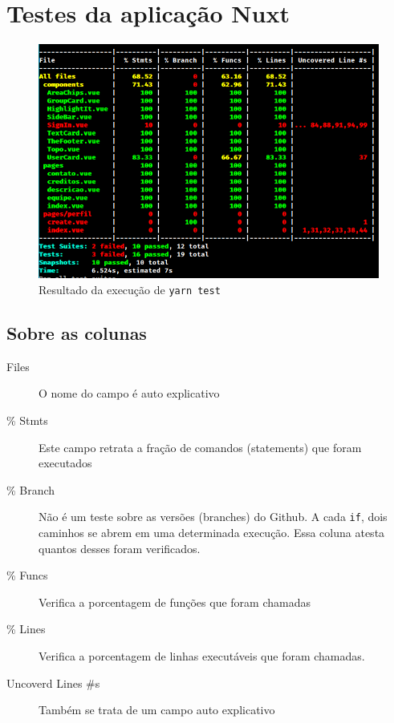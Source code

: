 \chapter{Testes da aplicação Nuxt}
\label{cap:nuxt-tests}
\minitoc


\begin{figure}[ht]
    \centering
    \includegraphics[width=.8\textwidth]{figuras/front-test.png}
    \caption{Resultado da execução de \texttt{yarn test}}
    \label{fig:test-nux}
\end{figure}

\section{Sobre as colunas}
\label{sec:colunas}

\begin{description}
    \item[Files] O nome do campo é auto explicativo
    \item[\% Stmts] Este campo retrata a fração de comandos (statements) que foram executados
    \item[\% Branch] Não é um teste sobre as versões (branches) do Github.
    A cada \texttt{if}, dois caminhos se abrem em uma determinada execução.
    Essa coluna atesta quantos desses  foram verificados.
    \item[\% Funcs] Verifica a porcentagem de funções que foram chamadas
    \item[\% Lines] Verifica a porcentagem de linhas executáveis que foram chamadas.
    \item[Uncoverd Lines \#s] Também se trata de um campo auto explicativo
\end{description}

